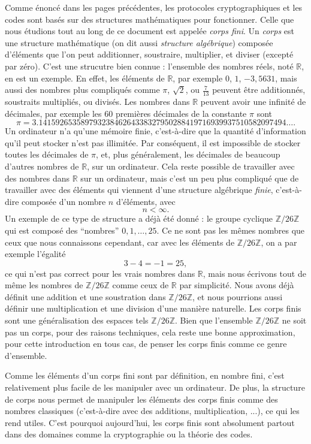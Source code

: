 Comme énoncé dans les pages précédentes, les protocoles cryptographiques et les
codes sont basés sur des structures mathématiques pour fonctionner. Celle que
nous étudions tout au long de ce document est appelée \emph{corps fini}. Un
\emph{corps} est une structure mathématique (on dit aussi \emph{structure
algébrique}) composée d'éléments que l'on peut additionner, soustraire,
multiplier, et diviser (excepté par zéro). C'est une strucutre bien connue :
l'ensemble des nombres réels, noté $\mathbb{R}$, en est un exemple. En effet,
les éléments de $\mathbb{R}$, par exemple $0$, $1$, $-3,5631$, mais aussi des
nombres plus compliqués comme $\pi$, $\sqrt2$, ou $\frac{7}{13}$ peuvent être
additionnés, soustraits multipliés, ou divisés. Les nombres dans $\mathbb{R}$
peuvent avoir une infinité de décimales, par exemple les $60$ premières
décimales de la constante $\pi$ sont
\[
  \pi = 3.14159265358979323846264338327950288419716939937510582097494\dots.
\]
Un ordinateur n'a qu'une mémoire finie, c'est-à-dire que la quantité
d'information qu'il peut stocker n'est pas illimitée. Par conséquent, il est
impossible de stocker toutes les décimales de $\pi$, et, plus généralement, les
décimales de beaucoup d'autres nombres de $\mathbb{R}$, sur un ordinateur. Cela
reste possible de travailler avec des nombres dans $\mathbb{R}$ sur un
ordinateur, mais c'est un peu plus compliqué que de travailler avec des éléments
qui viennent d'une structure algébrique \emph{finie}, c'est-à-dire composée d'un
nombre $n$ d'éléments, avec 
\[
  n < \infty.
\]
Un exemple de ce type de structure a déjà été donné : le groupe cyclique
$\mathbb{Z}/26\mathbb{Z}$ qui est composé des ``nombres'' $0, 1, \dots, 25$. Ce
ne sont pas les mêmes nombres que ceux que nous connaissons cependant, car avec
les éléments de $\mathbb{Z}/26\mathbb{Z}$, on a par exemple l'égalité
\[
  3-4 = -1 = 25,
\]
ce qui n'est pas correct pour les vrais nombres dans $\mathbb{R}$, mais nous
écrivons tout de même les nombres de $\mathbb{Z}/26\mathbb{Z}$ comme ceux de
$\mathbb{R}$ par simplicité. Nous avons déjà définit une addition et une
soustration dans $\mathbb{Z}/26\mathbb{Z}$, et nous pourrions aussi définir une
multiplication et une division d'une manière naturelle. Les corps finis sont une
généralisation des espaces tels $\mathbb{Z}/26\mathbb{Z}$. Bien que l'ensemble
$\mathbb{Z}/26\mathbb{Z}$ ne soit pas un corps, pour des raisons techniques,
cela reste une bonne approximation, pour cette introduction en tous cas, de
penser les corps finis comme ce genre d'ensemble.

Comme les éléments d'un corps fini sont par définition, en nombre fini, c'est
relativement plus facile de les manipuler avec un ordinateur. De plus, la
structure de corps nous permet de manipuler les éléments des corps finis comme
des nombres classiques (c'est-à-dire avec des additions, multiplication, ...),
ce qui les rend utiles. C'est pourquoi aujourd'hui, les corps finis sont
absolument partout dans des domaines comme la cryptographie ou la théorie des
codes.

